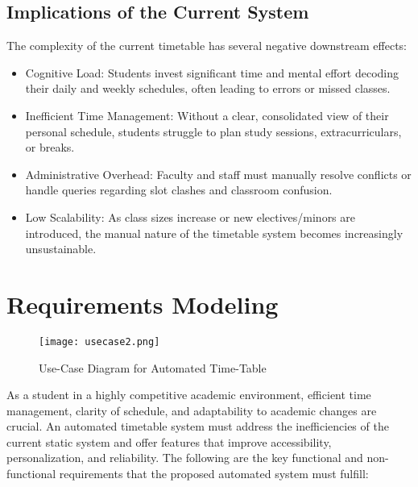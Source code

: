 \documentclass[a4paper,12pt]{article}
\begin{document}
\subsection{Implications of the Current System}
The complexity of the current timetable has several negative downstream effects:
\begin{itemize}
    \item Cognitive Load: Students invest significant time and mental effort decoding their daily and weekly schedules, often leading to errors or missed classes.
    \item Inefficient Time Management: Without a clear, consolidated view of their personal schedule, students struggle to plan study sessions, extracurriculars, or breaks.
    \item Administrative Overhead: Faculty and staff must manually resolve conflicts or handle queries regarding slot clashes and classroom confusion.
    \item Low Scalability: As class sizes increase or new electives/minors are introduced, the manual nature of the timetable system becomes increasingly unsustainable.
\end{itemize}
\section{Requirements Modeling}
\begin{figure}[H]
    \centering
    \texttt{[image: usecase2.png]}
    \caption{Use-Case Diagram for Automated Time-Table}
    \label{fig:placeholder}
\end{figure}
As a student in a highly competitive academic environment, efficient time management, clarity of schedule, and adaptability to academic changes are crucial. An automated timetable system must address the inefficiencies of the current static system and offer features that improve accessibility, personalization, and reliability. The following are the key functional and non-functional requirements that the proposed automated system must fulfill:



\newpage
\end{document}
